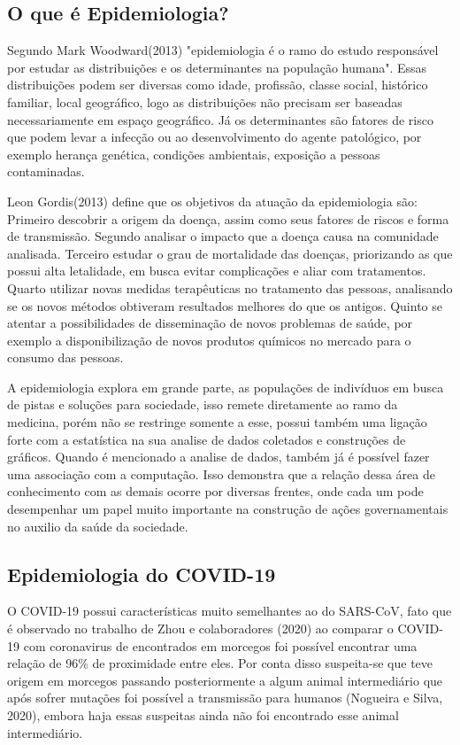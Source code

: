 \subsection{O que é Epidemiologia?}

Segundo Mark Woodward(2013) "epidemiologia é o ramo do estudo responsável por estudar as distribuições e os determinantes na população humana". Essas distribuições podem ser diversas como idade, profissão, classe social, histórico familiar, local geográfico, logo as distribuições não precisam ser baseadas necessariamente em espaço geográfico. Já os determinantes são fatores de risco que podem levar a infecção ou ao desenvolvimento do agente patológico, por exemplo herança genética, condições ambientais, exposição a pessoas contaminadas\cite{woodward2013epidemiology}. 

Leon Gordis(2013) define que os objetivos da atuação da epidemiologia são: Primeiro descobrir a origem da doença, assim como seus fatores de riscos e forma de transmissão. Segundo analisar o impacto que a doença causa na comunidade analisada. Terceiro estudar o grau de mortalidade das doenças, priorizando as que possui alta letalidade, em busca evitar complicações e aliar com tratamentos. Quarto utilizar novas medidas terapêuticas no tratamento das pessoas, analisando se os novos métodos obtiveram resultados melhores do que os antigos. Quinto se atentar a possibilidades de disseminação de novos problemas de saúde, por exemplo a disponibilização de novos produtos químicos no mercado para o consumo das pessoas\cite{gordis2013epidemiology}.  

A epidemiologia explora em grande parte, as populações de indivíduos em busca de pistas e soluções para sociedade, isso remete diretamente ao ramo da medicina, porém não se restringe somente a esse, possui também uma ligação forte com a estatística na sua analise de dados coletados e construções de gráficos. Quando é mencionado a analise de dados, também já é possível fazer uma associação com a computação. Isso demonstra que a relação dessa área de conhecimento com as demais ocorre por diversas frentes, onde cada um pode desempenhar um papel muito importante na construção de ações governamentais no auxilio da saúde da sociedade.

\subsection{Epidemiologia do COVID-19}

O COVID-19 possui características muito semelhantes ao do SARS-CoV, fato que é observado no trabalho de Zhou e colaboradores (2020) ao comparar o COVID-19 com coronavirus de encontrados em morcegos foi possível encontrar uma relação de 96\% de proximidade entre eles. Por conta disso suspeita-se que teve origem em morcegos passando posteriormente a algum animal intermediário que após sofrer mutações foi possível a transmissão para humanos (Nogueira e Silva, 2020), embora haja essas suspeitas ainda não foi encontrado esse animal intermediário. 

